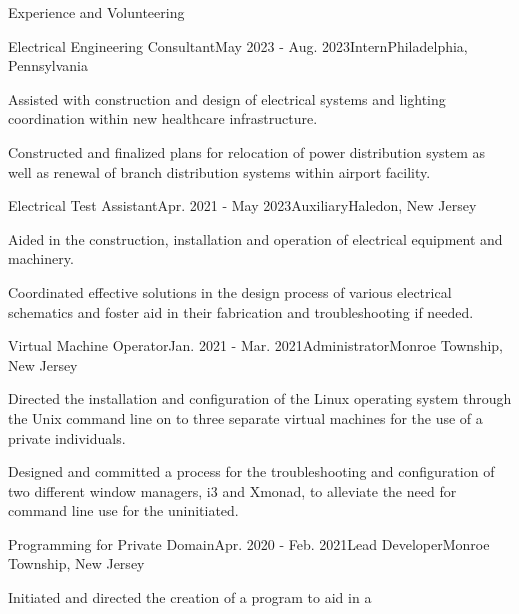 \documentclass{resume}
\begin{document}
    \begin{rSection}{Experience and Volunteering}
        \begin{rSubsection}{Electrical Engineering Consultant}{May 2023 - Aug. 2023}{Intern}{Philadelphia, Pennsylvania}
            \item Assisted with construction and design of electrical systems and lighting coordination within new healthcare infrastructure.
            \item Constructed and finalized plans for relocation of power distribution system as well as renewal of branch distribution systems within airport facility.
        \end{rSubsection}
        \begin{rSubsection}{Electrical Test Assistant}{Apr. 2021 - May 2023}{Auxiliary}{Haledon, New Jersey}
            \item Aided in the construction, installation and operation of
                electrical equipment and machinery.
            \item Coordinated effective solutions in the design process of
                various electrical schematics and foster aid in their
                fabrication and troubleshooting if needed.
        \end{rSubsection}
        \begin{rSubsection}{Virtual Machine Operator}{Jan. 2021 - Mar. 2021}{Administrator}{Monroe Township, New Jersey}
            \item Directed the installation and configuration of the Linux
                operating system through the Unix command line on to three
                separate virtual machines for the use of a private individuals.
            \item Designed and committed a process for the troubleshooting and
                configuration of two different window managers, i3 and Xmonad,
                to alleviate the need for command line use for the uninitiated.
        \end{rSubsection}
        \begin{rSubsection}{Programming for Private Domain}{Apr. 2020 - Feb. 2021}{Lead Developer}{Monroe Township, New Jersey}
            \item Initiated and directed the creation of a program to aid in a

\end{rSubsection}
\end{rSection}
\end{document}
